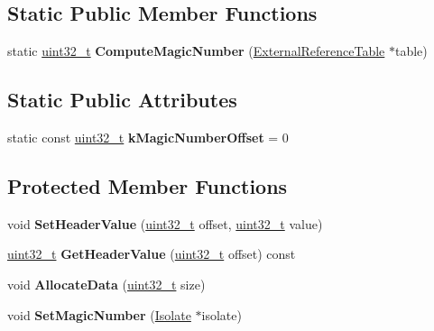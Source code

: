 \subsection*{Static Public Member Functions}
\begin{DoxyCompactItemize}
\item 
\mbox{\label{classv8_1_1internal_1_1SerializedData_a86390ee13da8e398dc0bbcccd86b9a47}} 
static \mbox{\hyperlink{classuint32__t}{uint32\+\_\+t}} {\bfseries Compute\+Magic\+Number} (\mbox{\hyperlink{classv8_1_1internal_1_1ExternalReferenceTable}{External\+Reference\+Table}} $\ast$table)
\end{DoxyCompactItemize}
\subsection*{Static Public Attributes}
\begin{DoxyCompactItemize}
\item 
\mbox{\label{classv8_1_1internal_1_1SerializedData_aad3e6b7fc3e0c5364198c22d08c3e30b}} 
static const \mbox{\hyperlink{classuint32__t}{uint32\+\_\+t}} {\bfseries k\+Magic\+Number\+Offset} = 0
\end{DoxyCompactItemize}
\subsection*{Protected Member Functions}
\begin{DoxyCompactItemize}
\item 
\mbox{\label{classv8_1_1internal_1_1SerializedData_a617333e419eb38d576477bee55228b1c}} 
void {\bfseries Set\+Header\+Value} (\mbox{\hyperlink{classuint32__t}{uint32\+\_\+t}} offset, \mbox{\hyperlink{classuint32__t}{uint32\+\_\+t}} value)
\item 
\mbox{\label{classv8_1_1internal_1_1SerializedData_afc826b682f302d60470d162db461d7cc}} 
\mbox{\hyperlink{classuint32__t}{uint32\+\_\+t}} {\bfseries Get\+Header\+Value} (\mbox{\hyperlink{classuint32__t}{uint32\+\_\+t}} offset) const
\item 
\mbox{\label{classv8_1_1internal_1_1SerializedData_afbfbeb68613a42f9076c7568f8e0afb0}} 
void {\bfseries Allocate\+Data} (\mbox{\hyperlink{classuint32__t}{uint32\+\_\+t}} size)
\item 
\mbox{\label{classv8_1_1internal_1_1SerializedData_a308da3a8f7ace2ead9fc60a0a12f1716}} 
void {\bfseries Set\+Magic\+Number} (\mbox{\hyperlink{classv8_1_1internal_1_1Isolate}{Isolate}} $\ast$isolate)
\end{DoxyCompactItemize}
